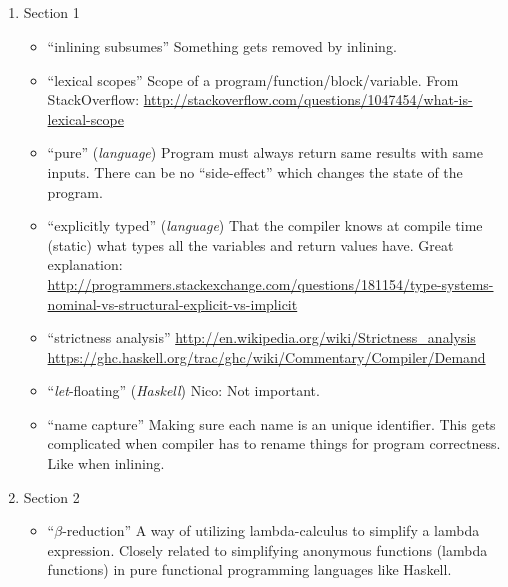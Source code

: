 

\subsection{\cite{GHCPaper}}
\begin{enumerate}

	\item Section 1
\begin{itemize}

	\item ``inlining subsumes''
Something gets removed by inlining.

	\item ``lexical scopes''
Scope of a program/function/block/variable.
From StackOverflow:
\url{http://stackoverflow.com/questions/1047454/what-is-lexical-scope}

	\item ``pure'' (\textit{language})
Program must always return same results with same inputs. There can be no
``side-effect'' which changes the state of the program.

	\item ``explicitly typed'' (\textit{language})
That the compiler knows at compile time (static) what types all the variables
and return values have.
Great explanation: \url{http://programmers.stackexchange.com/questions/181154/type-systems-nominal-vs-structural-explicit-vs-implicit}

	\item ``strictness analysis''
\url{http://en.wikipedia.org/wiki/Strictness_analysis}
\url{https://ghc.haskell.org/trac/ghc/wiki/Commentary/Compiler/Demand}

	\item ``\textit{let}-floating'' (\textit{Haskell})
Nico: Not important.

	\item ``name capture''
Making sure each name is an unique identifier. This gets complicated when
compiler has to rename things for program correctness. Like when inlining.

\end{itemize}

	\item Section 2
\begin{itemize}

	\item ``\textit{$\beta$}-reduction''
A way of utilizing lambda-calculus to simplify a lambda expression. Closely related to simplifying anonymous functions (lambda functions) in pure functional programming languages like Haskell.


\end{itemize}
\end{enumerate}
